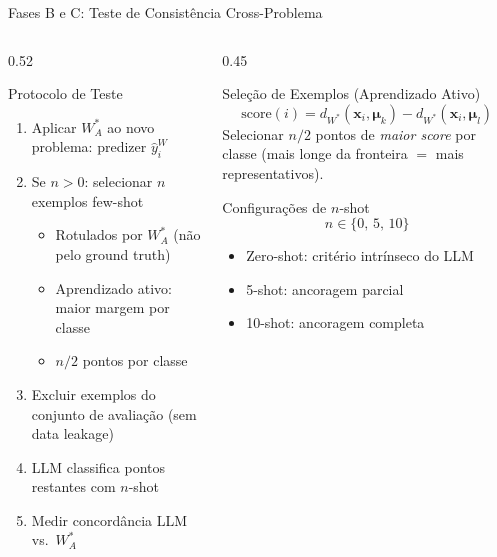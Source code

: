 \documentclass[aspectratio=169, 8pt]{beamer}
\begin{document}
\begin{frame}{Fases B e C: Teste de Consistência Cross-Problema}
  \begin{columns}[T]
    \begin{column}{0.52\textwidth}
      \begin{block}{Protocolo de Teste}
        \begin{enumerate}
          \item Aplicar $W^*_A$ ao novo problema: predizer $\hat{y}^W_i$
          \item Se $n>0$: selecionar $n$ exemplos few-shot
          \begin{itemize}
            \footnotesize
            \item Rotulados por $W^*_A$ (não pelo ground truth)
            \item Aprendizado ativo: maior margem por classe
            \item $n/2$ pontos por classe
          \end{itemize}
          \item Excluir exemplos do conjunto de avaliação (sem data leakage)
          \item LLM classifica pontos restantes com $n$-shot
          \item Medir concordância LLM vs.\ $W^*_A$
        \end{enumerate}
      \end{block}

    \end{column}

    \begin{column}{0.45\textwidth}
      \begin{block}{Seleção de Exemplos (Aprendizado Ativo)}
        \[
          \text{score}(i) = d_{W^*}(\mathbf{x}_i, \boldsymbol{\mu}_k) -
          d_{W^*}(\mathbf{x}_i, \boldsymbol{\mu}_l)
        \]
        Selecionar $n/2$ pontos de \emph{maior score} por classe
        (mais longe da fronteira $=$ mais representativos).
      \end{block}

      \vspace{0.1em}

      \begin{exampleblock}{Configurações de $n$-shot}
        \[
          n \in \{0,\, 5,\, 10\}
        \]
        \begin{itemize}
          \footnotesize
          \item Zero-shot: critério intrínseco do LLM
          \item 5-shot: ancoragem parcial
          \item 10-shot: ancoragem completa
        \end{itemize}
      \end{exampleblock}


\end{column}
\end{columns}
\end{frame}
\end{document}
